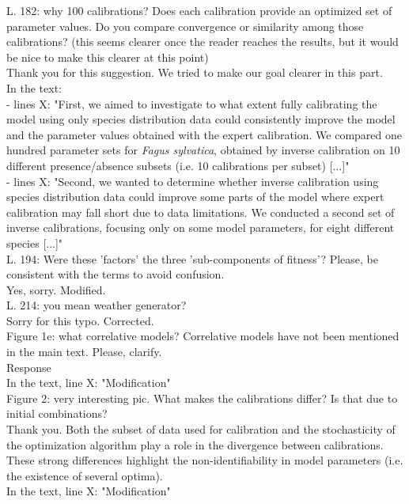 \documentclass[a4paper, 11pt]{article}
\begin{document}
\noindent L. 182: why 100 calibrations? Does each calibration provide an optimized set of parameter values. Do you compare convergence or similarity among those calibrations? (this seems clearer once the reader reaches the results, but it would be nice to make this clearer at this point)\\
\textcolor{customblue}{Thank you for this suggestion. We tried to make our goal clearer in this part.}\\
In the text:\\
- lines X: \textcolor{customred}{"First, we aimed to investigate to what extent fully calibrating the model using only species distribution data could consistently improve the model and the parameter values obtained with the expert calibration. We compared one hundred parameter sets for \emph{Fagus sylvatica}, obtained by inverse calibration on 10 different presence/absence subsets (i.e. 10 calibrations per subset) [...]"}\\
- lines X: \textcolor{customred}{"Second, we wanted to determine whether inverse calibration using species distribution data could improve some parts of the model where expert calibration may fall short due to data limitations. We conducted a second set of inverse calibrations, focusing only on some model parameters, for eight different species [...]"}\\

\noindent L. 194: Were these 'factors' the three 'sub-components of fitness'? Please, be consistent with the terms to avoid confusion.\\
\textcolor{customblue}{Yes, sorry. Modified.}\\

\noindent L. 214: you mean weather generator?\\
\textcolor{customblue}{Sorry for this typo. Corrected.}\\

\noindent Figure 1e: what correlative models? Correlative models have not been mentioned in the main text. Please, clarify.\\
\textcolor{customblue}{Response}\\
In the text, line X: \textcolor{customred}{"Modification"}\\

\noindent Figure 2: very interesting pic. What makes the calibrations differ? Is that due to initial combinations?\\
\textcolor{customblue}{Thank you. Both the subset of data used for calibration and the stochasticity of the optimization algorithm play a role in the divergence between calibrations. These strong differences highlight the non-identifiability in model parameters (i.e. the existence of several optima).}\\
In the text, line X: \textcolor{customred}{"Modification"}\\
\end{document}
